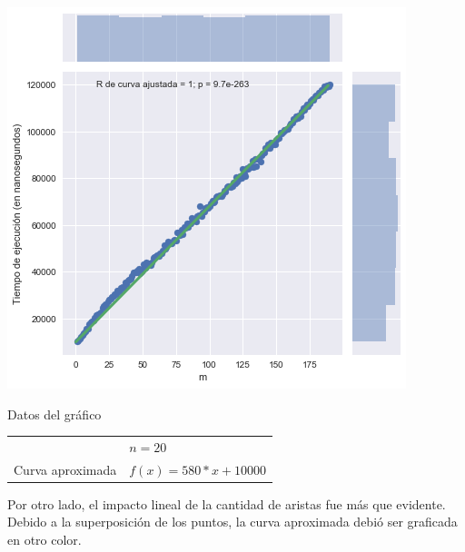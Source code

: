 \noindent
\begin{minipage}{0.55\textwidth}
    \hfill
    \includegraphics[scale=0.6]{img/greedy-m.png}
\end{minipage}
\hfill
\begin{minipage}{0.44\textwidth}
    \begin{center}
        Datos del gráfico

        \begin{tabular}{ | l l |}
            \hline
             & $n = 20$\\ 
            Curva aproximada & $f(x) = 580 * x + 10000$ \\
            \hline
        \end{tabular}
    \end{center}
\end{minipage}

Por otro lado, el impacto lineal de la cantidad de aristas fue más que evidente. Debido a la superposición de los puntos, la curva aproximada debió ser graficada en otro color.

